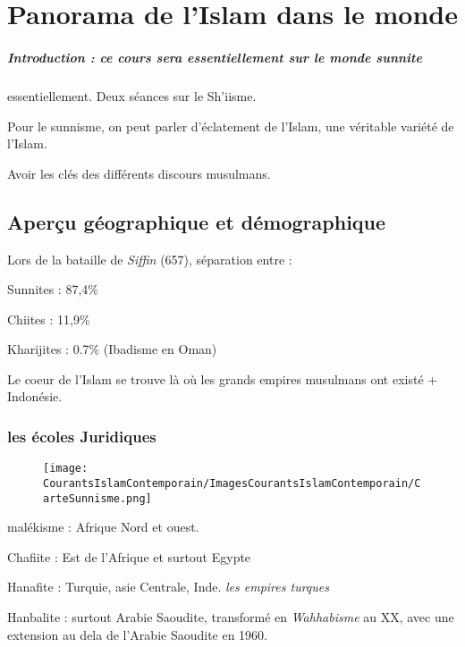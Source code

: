 \chapter{Panorama de l'Islam dans le monde}

\paragraph{Introduction : ce cours sera essentiellement sur le monde sunnite} essentiellement. Deux séances sur le Sh'iisme. 
\begin{Synthesis}
Pour le sunnisme, on peut parler d'éclatement de l'Islam, une véritable variété de l'Islam.
\end{Synthesis}
Avoir les clés des différents discours musulmans. 


\section{Aperçu géographique et démographique}

Lors de la bataille de \textit{Siffin} (657), séparation entre : 
\bi
\item Sunnites : 87,4\%
\item Chiites : 11,9\%
\item Kharijites : 0.7\% (Ibadisme en Oman)
\ei 

Le coeur de l'Islam se trouve là où les grands empires musulmans ont existé + Indonésie.


\subsection{les écoles Juridiques}
\begin{figure}
    \centering
    \texttt{[image: CourantsIslamContemporain/ImagesCourantsIslamContemporain/CarteSunnisme.png]}
 
    \label{fig:my_label}
\end{figure}



\bi 
\item  malékisme : Afrique Nord et ouest.
\item Chafiite : Est de l'Afrique et surtout Egypte 
\item Hanafite : Turquie, asie Centrale, Inde. \textit{les empires turques}
\item Hanbalite : surtout Arabie Saoudite, transformé en \textit{Wahhabisme} au XX, avec une extension au dela de l'Arabie Saoudite en 1960.
\ei 



